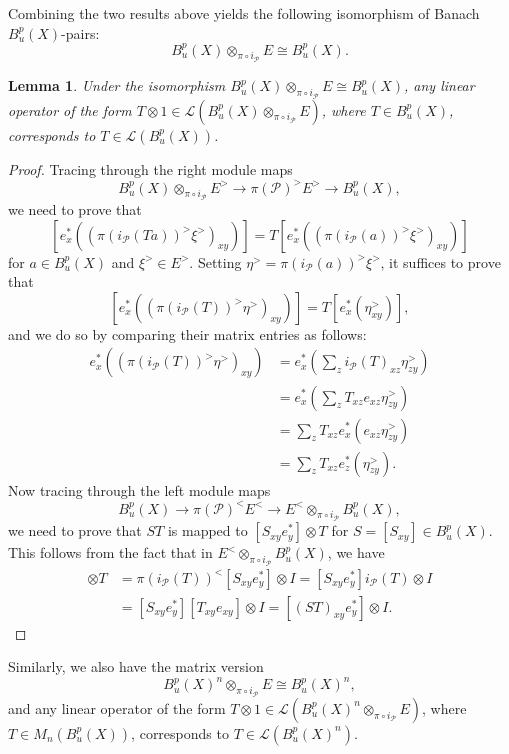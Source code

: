 \documentclass[a4,11pt]{amsart}
\newtheorem{lem}[thm]{Lemma}
\theoremstyle{remark}
\begin{document}

Combining the two results above yields the following isomorphism of Banach $B^p_u(X)$-pairs:
\[ B^p_u(X)\otimes_{\pi\circ i_\mathcal{P}}E\cong B^p_u(X). \]

\begin{lem}
Under the isomorphism $B^p_u(X)\otimes_{\pi\circ i_\mathcal{P}}E\cong B^p_u(X)$, any linear operator of the form $T\otimes 1\in\mathcal{L}(B^p_u(X)\otimes_{\pi\circ i_\mathcal{P}}E)$, where $T\in B^p_u(X)$, corresponds to $T\in\mathcal{L}(B^p_u(X))$.
\end{lem}

\begin{proof}
Tracing through the right module maps 
\[ B^p_u(X)\otimes_{\pi\circ i_\mathcal{P}}E^>\rightarrow\pi(\mathcal{P})^>E^>\rightarrow B^p_u(X),\] we need to prove that
\[ [e_x^*((\pi(i_\mathcal{P}(Ta))^>\xi^>)_{xy})]=T[e_x^*((\pi(i_\mathcal{P}(a))^>\xi^>)_{xy})] \]
for $a\in B^p_u(X)$ and $\xi^>\in E^>$. 
Setting $\eta^>=\pi(i_\mathcal{P}(a))^>\xi^>$, it suffices to prove that
\[ [e_x^*((\pi(i_\mathcal{P}(T))^>\eta^>)_{xy})]=T[e_x^*(\eta^>_{xy})], \]
and we do so by comparing their matrix entries as follows:
\begin{align*}
e_x^*((\pi(i_\mathcal{P}(T))^>\eta^>)_{xy}) 
&= e_x^*(\sum_z i_\mathcal{P}(T)_{xz}\eta^>_{zy}) \\
&= e_x^*(\sum_z T_{xz}e_{xz}\eta^>_{zy}) \\
&= \sum_z T_{xz}e_x^*(e_{xz}\eta^>_{zy}) \\
&= \sum_z T_{xz}e_z^*(\eta^>_{zy}).
\end{align*}
Now tracing through the left module maps
\[ B^p_u(X)\rightarrow\pi(\mathcal{P})^<E^<\rightarrow E^<\otimes_{\pi\circ i_\mathcal{P}}B^p_u(X), \]
we need to prove that $ST$ is mapped to $[S_{xy}e_y^*]\otimes T$ for $S=[S_{xy}]\in B^p_u(X)$. 
This follows from the fact that in $E^<\otimes_{\pi\circ i_\mathcal{P}}B^p_u(X)$, we have
\begin{align*} 
[S_{xy}e_y^*]\otimes T &= \pi(i_\mathcal{P}(T))^<[S_{xy}e_y^*]\otimes I=[S_{xy}e_y^*]i_\mathcal{P}(T)\otimes I \\ &= [S_{xy}e_y^*][T_{xy}e_{xy}]\otimes I=[(ST)_{xy}e_y^*]\otimes I. 
\end{align*}
\end{proof}

Similarly, we also have the matrix version
\[ B^p_u(X)^n\otimes_{\pi\circ i_\mathcal{P}}E\cong B^p_u(X)^n,\]
and any linear operator of the form $T\otimes 1\in\mathcal{L}(B^p_u(X)^n\otimes_{\pi\circ i_\mathcal{P}}E)$, where $T\in M_n(B^p_u(X))$, corresponds to $T\in\mathcal{L}(B^p_u(X)^n)$.
\end{document}
